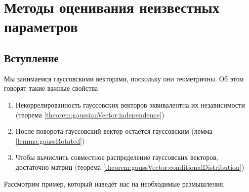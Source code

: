 \chapter{Методы оценивания неизвестных параметров}

\section{Вступление}

Мы занимаемся гауссовскими векторами, поскольку они геометричны. Об этом говорят
такие важные свойства
\begin{enumerate}
  \item Некоррелированность гауссовских векторов эквивалентна их независимости
      (теорема \ref{theorem:gaussianVector:independence})
  \item После поворота гауссовский вектор остаётся гауссовским
      (лемма \ref{lemma:gaussRotated})
  \item Чтобы вычислить совместное распределение гауссовских векторов,
      достаточно матриц
      (теорема \ref{theorem:gaussVector:conditionalDistribution})
\end{enumerate}

Рассмотрим пример, который наведёт нас на необходимые размышления.

